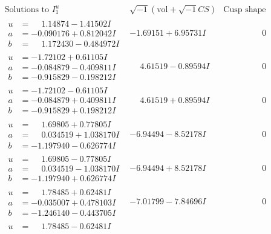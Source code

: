 \documentclass[1p]{elsarticle_modified}
\theoremstyle{definition}
\newcommand{\I}{\sqrt{-1}}
\begin{document}
$$\begin{array}{c|c|c}
\text{Solutions to }I^u_{1}& \I (\text{vol} + \sqrt{-1}CS) & \text{Cusp shape}\\
 \hline 
\begin{aligned}
u &= \phantom{-}1.14874 - 1.41502 I \\
a &= -0.090176 + 0.812042 I \\
b &= \phantom{-}1.172430 - 0.484972 I\end{aligned}
 & -1.69151 + 6.95731 I & \phantom{-0.000000 } 0 \\ \hline\begin{aligned}
u &= -1.72102 + 0.61105 I \\
a &= -0.084879 - 0.409811 I \\
b &= -0.915829 - 0.198212 I\end{aligned}
 & \phantom{-}4.61519 - 0.89594 I & \phantom{-0.000000 } 0 \\ \hline\begin{aligned}
u &= -1.72102 - 0.61105 I \\
a &= -0.084879 + 0.409811 I \\
b &= -0.915829 + 0.198212 I\end{aligned}
 & \phantom{-}4.61519 + 0.89594 I & \phantom{-0.000000 } 0 \\ \hline\begin{aligned}
u &= \phantom{-}1.69805 + 0.77805 I \\
a &= \phantom{-}0.034519 + 1.038170 I \\
b &= -1.197940 - 0.626774 I\end{aligned}
 & -6.94494 - 8.52178 I & \phantom{-0.000000 } 0 \\ \hline\begin{aligned}
u &= \phantom{-}1.69805 - 0.77805 I \\
a &= \phantom{-}0.034519 - 1.038170 I \\
b &= -1.197940 + 0.626774 I\end{aligned}
 & -6.94494 + 8.52178 I & \phantom{-0.000000 } 0 \\ \hline\begin{aligned}
u &= \phantom{-}1.78485 + 0.62481 I \\
a &= -0.035007 + 0.478103 I \\
b &= -1.246140 - 0.443705 I\end{aligned}
 & -7.01799 - 7.84696 I & \phantom{-0.000000 } 0 \\ \hline\begin{aligned}
u &= \phantom{-}1.78485 - 0.62481 I \\

\end{aligned}
\end{array}$$
\end{document}

